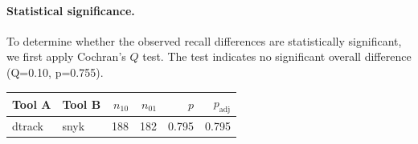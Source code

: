 \paragraph{Statistical significance.}
To determine whether the observed recall differences are statistically significant, we first apply Cochran's $Q$ test. The test indicates no significant overall difference (Q=0.10, p=0.755).

\begin{table}[!t]
\centering
\small
\begin{tabular}{llrrrr}
\toprule
Tool A & Tool B & $n_{10}$ & $n_{01}$ & $p$ & $p_{\mathrm{adj}}$ \\
\midrule
dtrack & snyk & 188 & 182 & 0.795 & 0.795 \\
\bottomrule
\end{tabular}
\end{table}
